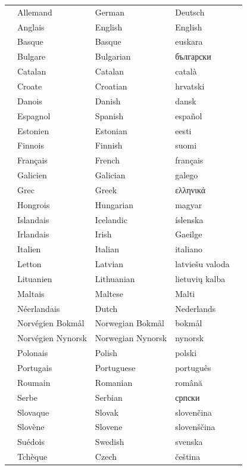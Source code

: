 \vspace*{-5mm}
\centering
  \setlength{\tabcolsep}{2em}
  \begin{tabularx}{\textwidth}{lllll} \toprule\addlinespace
  &Allemand & German & Deutsch& \\
  &Anglais & English & English& \\
  &Basque & Basque & euskara& \\
  &Bulgare & Bulgarian & български& \\
  &Catalan & Catalan & català& \\
  &Croate & Croatian & hrvatski& \\
  &Danois & Danish & dansk& \\
  &Espagnol & Spanish & español& \\
  &Estonien & Estonian & eesti& \\
  &Finnois & Finnish & suomi& \\
  &Français & French & français& \\
  &Galicien & Galician & galego& \\
  &Grec & Greek & ελληνικά& \\
  &Hongrois & Hungarian & magyar& \\ \addlinespace \bottomrule
  &Islandais & Icelandic & íslenska& \\
  &Irlandais & Irish & Gaeilge& \\
  &Italien & Italian & italiano& \\
  &Letton & Latvian & latviešu valoda& \\
  &Lituanien & Lithuanian & lietuvių kalba& \\
  &Maltais & Maltese & Malti& \\
  &Néerlandais & Dutch & Nederlands& \\
  &Norvégien Bokmål & Norwegian Bokmål & bokmål& \\
  &Norvégien Nynorsk & Norwegian Nynorsk & nynorsk& \\
  &Polonais & Polish & polski& \\
  &Portugais & Portuguese & português& \\
  &Roumain & Romanian & română& \\
  &Serbe & Serbian & српски& \\
  &Slovaque & Slovak & slovenčina& \\
  &Slovène & Slovene & slovenščina& \\
  &Suédois & Swedish & svenska& \\
  &Tchèque & Czech & čeština& \\
\end{tabularx}
